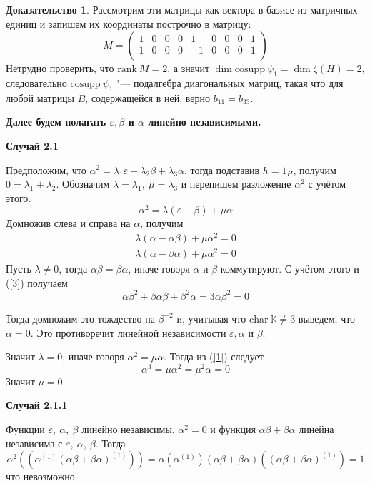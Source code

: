 \documentclass[a4paper, 12pt]{article}
\theoremstyle{definition}
\newtheorem*{prof}{\hspace*{\parindent}Доказательство}
\begin{document}
\begin{prof}
    Рассмотрим эти матрицы как вектора в базисе из матричных единиц и запишем их координаты построчно в матрицу: \[
        M = \begin{pmatrix}
            1 & 0 & 0 & 0 & 1 & 0 & 0 & 0 & 1\\
            1 & 0 & 0 & 0 & -1 & 0 & 0 & 0 & 1\\
        \end{pmatrix}
    \]
    Нетрудно проверить, что $\mathrm{rank}\ M = 2$, а значит $\dim \mathrm{cosupp}\ \psi_1 = \dim \zeta(H) = 2$, следовательно $\mathrm{cosupp}\ \psi_1$ "--- подалгебра диагональных матриц, такая что для любой матрицы $B$, содержащейся в ней, верно $b_{11}=b_{33}$.
    
    \textbf{Далее будем полагать $\varepsilon, \beta$ и $\alpha$ линейно независимыми.}

    \textbf{Случай 2.1}
    
    \noindent Предположим, что $\alpha^2 = \lambda_1\varepsilon + \lambda_2\beta + \lambda_3 \alpha$, тогда подставив $h = 1_H$, получим $0 = \lambda_1+\lambda_2$. Обозначим $\lambda = \lambda_1,\ \mu = \lambda_3$ и перепишем разложение $\alpha^2$ с учётом этого.
    \[\alpha^2 = \lambda(\varepsilon - \beta) + \mu \alpha\]
    Домножив слева и справа на $\alpha$, получим 
    \begin{eqnarray*}
        \lambda(\alpha-\alpha\beta) + \mu\alpha^2 = 0\\
        \lambda(\alpha-\beta\alpha) + \mu\alpha^2 = 0
    \end{eqnarray*}
    Пусть $\lambda \neq 0$, тогда $\alpha\beta = \beta\alpha$, иначе говоря $\alpha$ и $\beta$ коммутируют. С учётом этого и  (\ref{3}) получаем
    \[
    \alpha\beta^2+\beta\alpha\beta+\beta^2\alpha = 3\alpha\beta^2 = 0
    \]

    Тогда домножим это тождество на $\beta^{-2}$ и, учитывая что $\mathrm{char}\ \mathbb{K} \neq 3$ выведем, что $\alpha = 0$. Это противоречит линейной независимости $\varepsilon, \alpha$ и $\beta$.

    Значит $\lambda = 0$, иначе говоря $\alpha^2 = \mu\alpha$. Тогда из (\ref{1}) следует 
    \[
    \alpha^3 = \mu\alpha^2 = \mu^2\alpha = 0
    \]
    Значит $\mu = 0$. 

    \textbf{Случай 2.1.1}

    Функции $\varepsilon,\ \alpha,\ \beta$ линейно независимы, $\alpha^2 =0$ и функция $\alpha\beta+\beta\alpha$ линейна независима с $\varepsilon,\ \alpha,\ \beta$.
    Тогда \[
    \alpha^2\left(\left(\alpha^{(1)}(\alpha\beta+\beta\alpha)^{(1)}\right)\right) = \alpha(\alpha^{(1)})(\alpha\beta+\beta\alpha)\left((\alpha\beta+\beta\alpha)^{(1)}\right) = 1
    \]
    что невозможно.


\end{prof}
\end{document}
